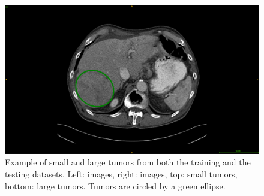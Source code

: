 \begin{figure}[!ht]
\begin{minipage}{0.45\linewidth}
	\end{minipage} \hspace{-0.1cm}
	\begin{minipage}{0.45\linewidth}
		\includegraphics[width=\linewidth]{../Contributions/images/LITS_exampleLargeTumor_withEllipse_2}
	\end{minipage}
	\caption{Example of small and large tumors from both the training and the testing datasets. Left: \textbf{} images, right: \textbf{} images, top: small tumors, bottom: large tumors. Tumors are circled by a green ellipse.}
	\label{fig:interdb_tumorExamples}
\end{figure}
